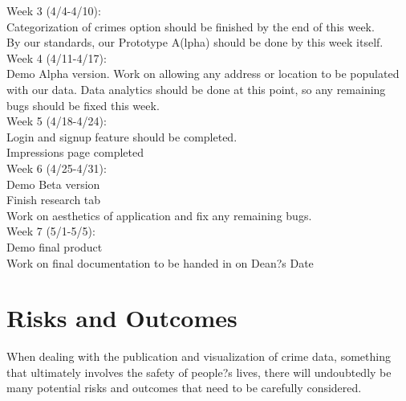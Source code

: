 \documentclass[paper=a4, fontsize=11pt]{scrartcl} %
\numberwithin{equation}{section} %
\numberwithin{figure}{section} %
\numberwithin{table}{section} %
\begin{document}
Week 3 (4/4-4/10): \\
Categorization of crimes option should be finished by the end of this week. \\
By our standards, our Prototype A(lpha) should be done by this week itself.\\

Week 4 (4/11-4/17): \\
Demo Alpha version. 
Work on allowing any address or location to be populated with our data. 
Data analytics should be done at this point, so any remaining bugs should be fixed this week. \\

Week 5 (4/18-4/24): \\
Login and signup feature should be completed. \\
Impressions page completed \\

Week 6 (4/25-4/31): \\
Demo Beta version \\
Finish research tab \\
Work on aesthetics of application and fix any remaining bugs. \\

Week 7 (5/1-5/5): \\
Demo final product \\
Work on final documentation to be handed in on Dean?s Date \\


\section{Risks and Outcomes}

When dealing with the publication and visualization of crime data, something that ultimately involves the safety of people?s lives, there will undoubtedly be many potential risks and outcomes that need to be carefully considered. \\
\end{document}
